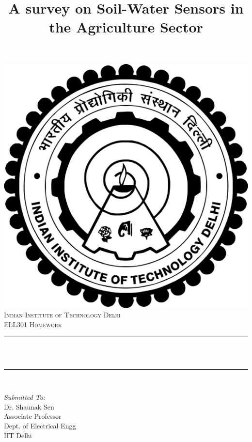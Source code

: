\documentclass[11pt]{article}
\title{A survey on Soil-Water Sensors in the Agriculture Sector}								%
\makeatletter
\let\thetitle\@title
\makeatother
\begin{document}

\begin{titlepage}
	\centering
    \vspace*{0.5 cm}
    \includegraphics[scale = 0.075]{IIT_Delhi_logo.png}\\[1.0 cm]	%
    \textsc{\LARGE Indian Institute of Technology Delhi}\\[2.0 cm]	%
	\textsc{\LARGE ELL301 Homework}\\[0.5 cm]				%
	\rule{\linewidth}{0.2 mm} \\[0.4 cm]
	{ \huge \bfseries \thetitle}\\
	\rule{\linewidth}{0.2 mm} \\[3.5 cm]
	
	\begin{minipage}{0.4\textwidth}
		\begin{flushleft} \large
			\emph{Submitted To:}\\
			Dr. Shaunak Sen\\
			Associate Professor\\
			Dept. of Electrical Engg\\
			IIT Delhi
			\end{flushleft}
			\end{minipage}~
			\begin{minipage}{0.4\textwidth}
            

\end{minipage}
\end{titlepage}
\end{document}

